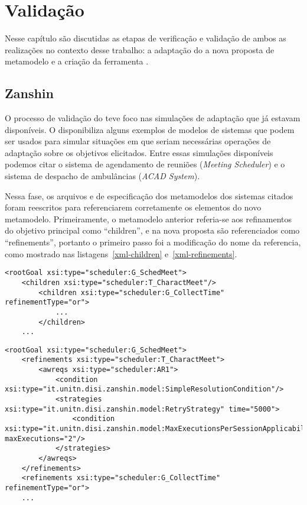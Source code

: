 
\chapter{Validação}
\label{sec-validacao}

Nesse capítulo são discutidas as etapas de verificação e validação de ambos as realizações no contexto desse trabalho: a adaptação do \zanshin a nova proposta de metamodelo e a criação da ferramenta \unagi.

\section{Zanshin}
\label{sec-validacao-zanshin}

O processo de validação do \zanshin teve foco nas simulações de adaptação que já estavam disponíveis. O \framework disponibiliza alguns  exemplos de modelos de sistemas que podem ser usados para simular situações em que  seriam necessárias operações de adaptação sobre os objetivos elicitados. Entre essas simulações disponíveis podemos citar o sistema de agendamento de reuniões (\textit{Meeting Scheduler}) e o sistema de despacho de ambulâncias (\textit{ACAD System}).

Nessa fase, os arquivos \ecore e \xml de especificação dos metamodelos dos sistemas citados foram reescritos para referenciarem corretamente os elementos do novo metamodelo. Primeiramente, o metamodelo anterior referia-se aos refinamentos do objetivo principal como ``children'', e na nova proposta são referenciados como ``refinements'', portanto o primeiro passo foi a modificação do nome da referencia, como mostrado nas listagens~\ref{xml-children} e~\ref{xml-refinements}. 

\begin{lstlisting}[caption={Trecho de XML representando o ACAD no metamodelo antigo},label={xml-children}]
<rootGoal xsi:type="scheduler:G_SchedMeet">
	<children xsi:type="scheduler:T_CharactMeet"/>
		<children xsi:type="scheduler:G_CollectTime" refinementType="or">
			...
		</children>
	...
\end{lstlisting}

\begin{lstlisting}[caption={Trecho de XML representando o ACAD no novo metamodelo},label={xml-refinements}]
<rootGoal xsi:type="scheduler:G_SchedMeet">
	<refinements xsi:type="scheduler:T_CharactMeet">
		<awreqs xsi:type="scheduler:AR1">
			<condition xsi:type="it.unitn.disi.zanshin.model:SimpleResolutionCondition"/>
			<strategies xsi:type="it.unitn.disi.zanshin.model:RetryStrategy" time="5000">
				<condition xsi:type="it.unitn.disi.zanshin.model:MaxExecutionsPerSessionApplicabilityCondition" maxExecutions="2"/>
			</strategies>
		</awreqs>
	</refinements>
	<refinements xsi:type="scheduler:G_CollectTime" refinementType="or">
	...
\end{lstlisting}

